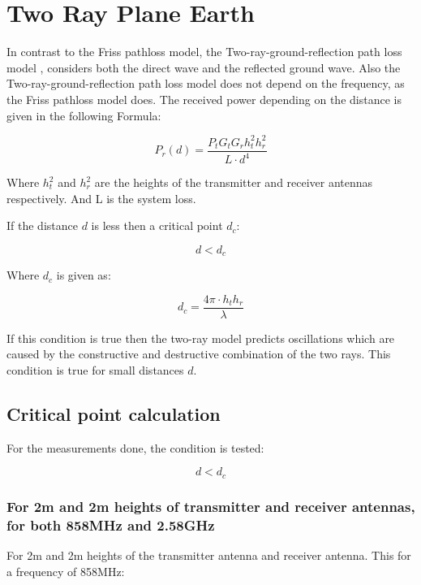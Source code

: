 \section{Two Ray Plane Earth}
In contrast to the Friss pathloss model, the Two-ray-ground-reflection path loss model \citep{two_ray}, considers both the direct wave and the reflected ground wave. Also the Two-ray-ground-reflection path loss model does not depend on the frequency, as the Friss pathloss model does. The received power depending on the distance is given in the following Formula:

\begin{equation}
P_r(d) = \frac{P_t G_t G_r h^2_t h^2_r}{L \cdot d^4}
\label{two_ray_model}
\end{equation}

Where $h^2_t$ and $h^2_r$ are the heights of the transmitter and receiver antennas respectively. And L is the system loss. 

If the distance $d$ is less then a critical point $d_{c}$: 

\begin{equation}
d<d_{c}
\label{two_ray_cond}
\end{equation}

Where $d_{c}$ is given as:

\begin{equation}
d_{c} = \frac{4\pi \cdot h_t h_r}{\lambda}
\label{critical_fac_dc}
\end{equation}

If this condition is true then the two-ray model predicts oscillations which are caused by the constructive and destructive combination of the two rays. This condition is true for small distances $d$.

\subsection{Critical point calculation}
For the measurements done, the condition is tested:

\begin{equation}
d<d_{c}
\label{two_ray_cond_1}
\end{equation}

\subsubsection{For 2m and 2m heights of transmitter and receiver antennas, for both 858MHz and 2.58GHz}

For 2m and 2m heights of the transmitter antenna and receiver antenna. This for a frequency of 858MHz:

